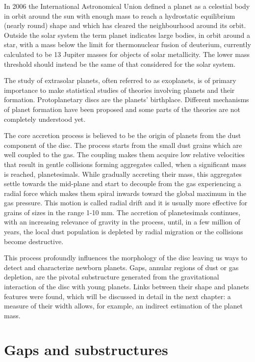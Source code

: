 \documentclass[a4paper,10pt]{report}
\begin{document}
In 2006 the International Astronomical Union defined a planet as a celestial body in orbit around the sun with enough mass 
to reach a hydrostatic equilibrium (nearly round) shape and which has cleared the neighbourhood around its orbit. Outside the solar system 
the term planet indicates large bodies, in orbit around a star,
with a mass below the limit for thermonuclear fusion of deuterium, 
currently calculated to be 13 Jupiter masses for objects of solar metallicity. The lower mass threshold should instead be the same of that considered
for the solar system.

The study of extrasolar planets, often referred to as exoplanets, is of primary importance to make statistical studies of theories 
involving planets and their formation. Protoplanetary discs are the planets' birthplace. 
Different mechanisms of planet formation have been proposed and some parts of the theories are not completely
understood yet. 

The core accretion process \citep[pp. 25-26]{veronesi_phdthesis} is believed to be the origin of planets from the dust component of the disc. 
The process starts from the small dust grains which are well coupled to the gas.
The coupling makes them acquire low relative velocities that result in gentle collisions forming aggregates called, when a significant mass is reached, planetesimals.
While gradually accreting their mass, this aggregates settle towards the mid-plane and start to decouple from the gas experiencing a radial force 
which makes them spiral inwards toward the global maximum in the gas pressure. This motion is called radial drift and it is usually more effective for grains of sizes in the range 
1-10 mm.
The accretion of planetesimals continues, with an increasing relevance of gravity in the process,
until, in a few million of years, the local dust population is depleted by radial migration or the collisions become destructive.

This process profoundly influences the morphology of the disc leaving us ways to detect and characterize newborn planets. 
Gaps, annular regions of dust or gas depletion, are the pivotal substructure generated from the gravitational interaction of the disc with young planets.
Links between their shape and planets features were found, which will be discussed in detail in the next chapter:
a measure of their width allows, for example, an indirect estimation of the planet mass.

\section{Gaps and substructures}
\end{document}
